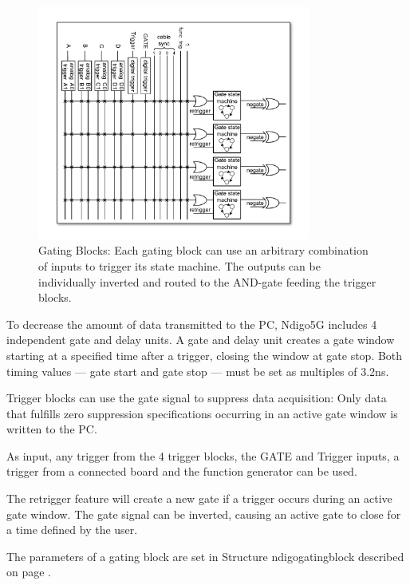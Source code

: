 		\begin{figure}[ht]
			\begin{center}
				\includegraphics[width=0.8\textwidth]{figures/GatingBlocks.pdf}
				\caption{\label{fig:GatingBlock} Gating Blocks: Each gating block can use an arbitrary combination of inputs to trigger its state machine. The outputs can be individually inverted and routed to the AND-gate feeding the trigger blocks.}
			\end{center}
		\end{figure}
		
		To decrease the amount of data transmitted to the PC, Ndigo5G includes 4 independent gate and delay units. A gate and delay unit creates a gate window starting at a specified time after a trigger, closing the window at gate stop. Both timing values — gate start and gate stop — must be set as 
multiples of 3.2ns.\par

		Trigger blocks can use the gate signal to suppress data acquisition: Only data that fulfills zero suppression specifications occurring in an active gate window is written to the PC.\par
		As input, any trigger from the 4 trigger blocks, the GATE and Trigger inputs, a trigger from a connected board and the function generator can be used.\par
		
		The retrigger feature will create a new gate if a trigger occurs during an active gate window. The gate signal can be inverted, causing an active gate to close for a time defined by the user.\par
		
		The parameters of a gating block are set in Structure \textsf{ndigo\textunderscore gating\textunderscore block} described on page \pageref{cp:gatingblock}.\par
		
